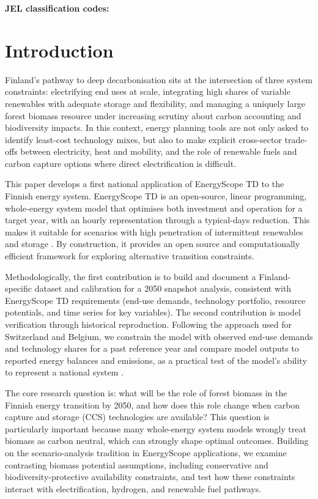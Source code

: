 \documentclass{article}
\begin{document}
\textbf{JEL classification codes:} 

\newpage

\section*{Introduction}


Finland's pathway to deep decarbonisation sits at the intersection of three system constraints: electrifying end uses at scale, integrating high shares of variable renewables with adequate storage and flexibility, and managing a uniquely large forest biomass resource under increasing scrutiny about carbon accounting and biodiversity impacts. In this context, energy planning tools are not only asked to identify least-cost technology mixes, but also to make explicit cross-sector trade-offs between electricity, heat and mobility, and the role of renewable fuels and carbon capture options where direct electrification is difficult.

This paper develops a first national application of EnergyScope TD to the Finnish energy system. EnergyScope TD is an open-source, linear programming, whole-energy system model that optimises both investment and operation for a target year, with an hourly representation through a typical-days reduction. This makes it suitable for scenarios with high penetration of intermittent renewables and storage \citep{limpens_energyscope_2019,limpens_energyscope_2024}. By construction, it provides an open source and computationally efficient framework for exploring alternative transition constraints.

Methodologically, the first contribution is to build and document a Finland-specific dataset and calibration for a 2050 snapshot analysis, consistent with EnergyScope TD requirements (end-use demands, technology portfolio, resource potentials, and time series for key variables). The second contribution is model verification through historical reproduction. Following the approach used for Switzerland and Belgium, we constrain the model with observed end-use demands and technology shares for a past reference year and compare model outputs to reported energy balances and emissions, as a practical test of the model's ability to represent a national system \citep{moret_characterization_2017,thiran_exploring_2025,limpens_generating_2021}.

The core research question is: what will be the role of forest biomass in the Finnish energy transition by 2050, and how does this role change when carbon capture and storage (CCS) technologies are available? This question is particularly important because many whole-energy system models wrongly treat biomass as carbon neutral, which can strongly shape optimal outcomes. Building on the scenario-analysis tradition in EnergyScope applications, we examine contrasting biomass potential assumptions, including conservative and biodiversity-protective availability constraints, and test how these constraints interact with electrification, hydrogen, and renewable fuel pathways.
\end{document}
